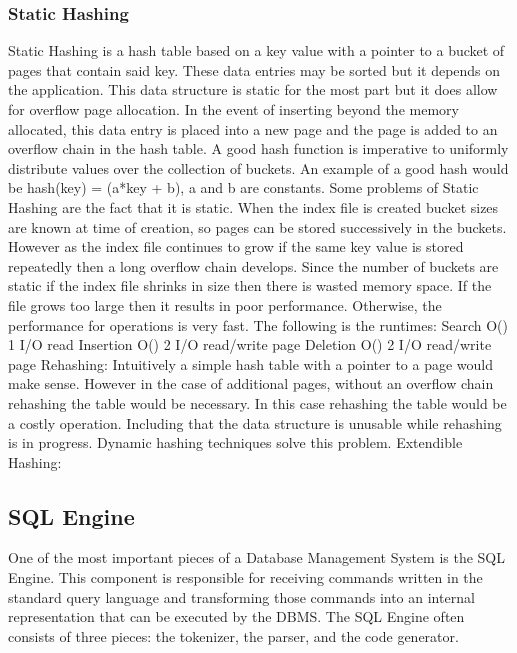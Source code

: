 \documentclass[letterpaper]{article}
\begin{document}
\subsubsection{Static Hashing}
Static Hashing is a hash table based on a key value with a pointer to a bucket of pages that contain said key. These data entries may be sorted but it depends on the application. This data structure is static for the most part but it does allow for overflow page allocation. In the event of inserting beyond the memory allocated, this data entry is placed into a new page and the page is added to an overflow chain in the hash table.
A good hash function is imperative to uniformly distribute values over the collection of buckets. An example of a good hash would be hash(key) = (a*key + b), a and b are constants. Some problems of Static Hashing are the fact that it is static. When the index file is created bucket sizes are known at time of creation, so pages can be stored successively in the buckets. However as the index file continues to grow if the same key value is stored repeatedly then a long overflow chain develops. Since the number of buckets are static if the index file shrinks in size then there is wasted memory space. If the file grows too large then it results in poor performance. Otherwise, the performance for operations is very fast. The following is the runtimes:
Search O() 1 I/O read
Insertion O() 2 I/O read/write page
Deletion O() 2 I/O read/write page
Rehashing:
	Intuitively a simple hash table with a pointer to a page would make sense. However in the case of additional pages, without an overflow chain rehashing the table would be necessary. In this case rehashing the table would be a costly operation. Including that the data structure is unusable while rehashing is in progress. Dynamic hashing techniques solve this problem.
Extendible Hashing:

\subsection{SQL Engine}
One of the most important pieces of a Database Management System is the SQL Engine. 
This component is responsible for receiving commands written in the standard query
language and transforming those commands into an internal representation that can be
executed by the DBMS. The SQL Engine often consists of three pieces: the tokenizer, the
parser, and the code generator.
\end{document}
